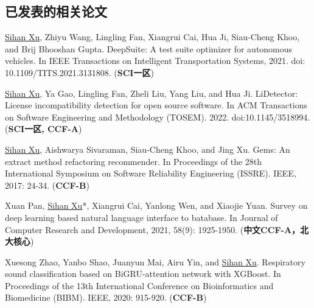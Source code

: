 \documentclass[a4paper,zihao=-4]{article}
\begin{document}
\subsection{已发表的相关论文}

\begin{enumerate}[label={[\arabic*]}]
	\item \underline{Sihan Xu}, Zhiyu Wang, Lingling Fan, Xiangrui Cai, Hua Ji,
	      Siau-Cheng Khoo, and Brij Bhooshan Gupta. DeepSuite: A test suite optimizer
	      for autonomous vehicles. In IEEE Transactions on Intelligent Transportation
	      Systems, 2021. doi: 10.1109/TITS.2021.3131808. (\textbf{SCI一区})
	
	\item \underline{Sihan Xu}, Ya Gao, Lingling Fan, Zheli Liu, Yang Liu, and
	      Hua Ji. LiDetector: License incompatibility detection for open source
	      software. In ACM Transactions on Software Engineering and Methodology
	      (TOSEM). 2022. doi:10.1145/3518994. (\textbf{SCI一区, CCF-A})
	\item \underline{Sihan Xu}, Aishwarya Sivaraman, Siau-Cheng Khoo, and Jing
	      Xu. Gems: An extract method refactoring recommender. In Proceedings of the
	      28th International Symposium on Software Reliability Engineering (ISSRE).
	      IEEE, 2017: 24-34. (\textbf{CCF-B})

	      \iffalse
	\item \underline{Sihan Xu}, Ya Gao, Xiangrui Cai, Zhiyu Wang, and Hua Ji.
	      Effective Multi-Fault Localization Based on Fault-Relevant Statistics. In
	      Proceedings of the 45th Annual Computers, Software, and Applications Conference
	      (COMPSAC). IEEE, 2021: 998-1003. (\textbf{CCF-C})

	\item \underline{Sihan Xu}, Sen Zhang, Weijing Wang, Xinya Cao, Chenkai Guo,
	      and Jing Xu. Method name suggestion with hierarchical attention
	      networks[C]//Proceedings of the 2019 ACM SIGPLAN Workshop on Partial
	      Evaluation and Program Manipulation (PEPM). 2019: 10-21. (\textbf{CCF-C})
	      \fi

	\item Xuan Pan, \underline{Sihan Xu}*, Xiangrui Cai, Yanlong Wen, and
	      Xiaojie Yuan. Survey on deep learning based natural language interface to
	      batabase. In Journal of Computer Research and Development, 2021, 58(9):
	      1925-1950. (\textbf{中文CCF-A，北大核心})

	\item Xuesong Zhao, Yanbo Shao, Juanyun Mai, Airu Yin, and \underline{Sihan
		      Xu}. Respiratory sound classification based on BiGRU-attention network with
	      XGBoost. In Proceedings of the 13th International Conference on
	      Bioinformatics and Biomedicine (BIBM). IEEE, 2020: 915-920. (\textbf{CCF-B})


\end{enumerate}
\end{document}
